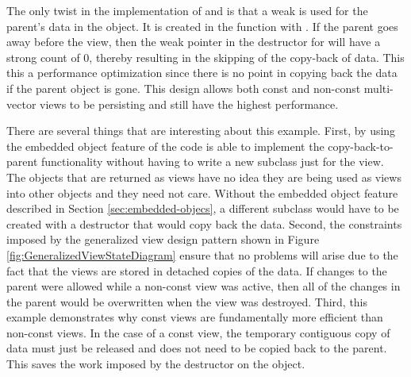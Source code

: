\documentclass[pdf,ps2pdf,11pt]{SANDreport}
\begin{document}
The only twist in the implementation of
{} and
{} is that a weak {}
is used for the parent's {} data in the
{} object.  It is created in the
function {} with
{}.  If the parent goes away before
the view, then the weak pointer {} in the
destructor for {} will have a
strong count of 0, thereby resulting in the skipping of the copy-back
of data.  This this a performance optimization since there is no point
in copying back the data if the parent object is gone.  This design
allows both const and non-const multi-vector views to be persisting
and still have the highest performance.


There are several things that are interesting about this example.
First, by using the embedded object feature of {} the code is
able to implement the copy-back-to-parent functionality without having
to write a new {} subclass just for the view.  The
{} objects that are returned as views have
no idea they are being used as views into other
{} objects and they need not care.
Without the embedded object feature described in Section
{}\ref{sec:embedded-objecs}, a different {} subclass
would have to be created with a destructor that would copy back the
data.  Second, the constraints imposed by the generalized view design
pattern shown in Figure {}\ref{fig:GeneralizedViewStateDiagram} ensure
that no problems will arise due to the fact that the views are stored
in detached copies of the data.  If changes to the parent
{} were allowed while a non-const
{} view was active, then all of the
changes in the parent would be overwritten when the
{} view was destroyed.  Third, this
example demonstrates why const views are fundamentally more efficient
than non-const views.  In the case of a const view, the temporary
contiguous copy of data must just be released and does not need to be
copied back to the parent.  This saves the work imposed by the
destructor on the {} object.
\end{document}
